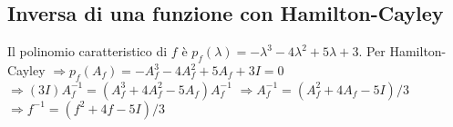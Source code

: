 \subsection{Inversa di una funzione con Hamilton-Cayley}

Il polinomio caratteristico di $f$ è $p_f(\lambda) = -\lambda^3-4\lambda^2+5\lambda+3$.
Per Hamilton-Cayley $\Rightarrow p_f(A_f) = -A_f^3-4A_f^2+5A_f+3I = 0$
$\Rightarrow (3I)A_f^{-1} = (A_f^3+4A_f^2-5A_f)A_f^{-1}$
$\Rightarrow A_f^{-1} = (A_f^2+4A_f-5I)/3$
$\Rightarrow f^{-1} = (f^2+4f-5I)/3$

